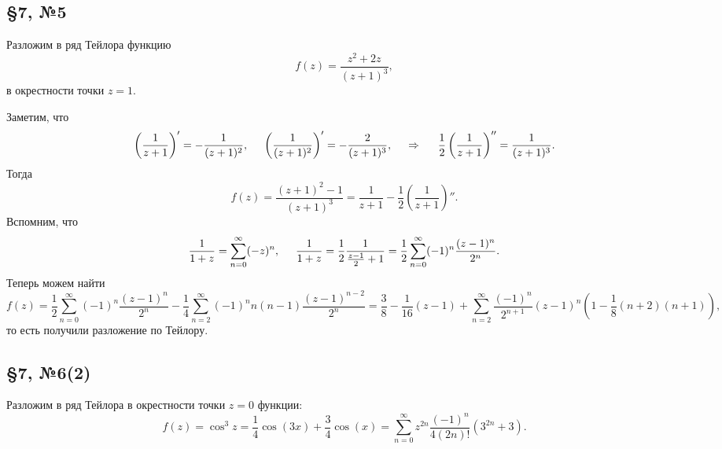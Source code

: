 \subsection*{\S7, №5}

Разложим в ряд Тейлора функцию
\begin{equation*}
    f(z) = \frac{z^2 + 2 z}{(z+1)^3},
\end{equation*}
в окрестности точки $z = 1$. 

Заметим, что
\begin{equation*}
    \left(\frac{1}{z+1}\right)' = - \frac{1}{(z+1)^2},
    \hspace{5 mm} 
    \left(\frac{1}{(z+1)^2}\right)' = - \frac{2}{(z+1)^3},
    \hspace{0.5cm} \Rightarrow \hspace{0.5cm}
    \frac{1}{2} \left(\frac{1}{z+1}\right)'' = \frac{1}{(z+1)^3}.
\end{equation*}
Тогда
\begin{equation*}
    f(z) = \frac{(z+1)^2 - 1}{(z+1)^3} = \frac{1}{z + 1} - \frac{1}{2} \left(\frac{1}{z + 1}\right)''.
\end{equation*}
Вспомним, что
\begin{equation*}
    \frac{1}{1 + z} = \sum_{n=0}^{\infty} (-z)^n,
    \hspace{5 mm} 
    \frac{1}{1+z} = \frac{1}{2} \frac{1}{\frac{z-1}{2}+1} = \frac{1}{2} \sum_{n=0}^{\infty} (-1)^n \frac{(z-1)^n}{2^n}.
\end{equation*}
Теперь можем найти
\begin{equation*}
    f(z) = \frac{1}{2} \sum_{n=0}^{\infty}  (-1)^n \frac{(z-1)^n}{2^n} - 
    \frac{1}{4} \sum_{n=2}^{\infty}  (-1)^n n (n-1) \frac{(z-1)^{n-2}}{2^n} = 
    \frac{3}{8} - \frac{1}{16}(z-1) + 
    \sum_{n=2}^{\infty} \frac{(-1)^n}{2^{n+1}} (z-1)^n \left(
        1 - \frac{1}{8}(n+2) (n+1)
    \right),
\end{equation*}
то есть получили разложение по Тейлору. 




\subsection*{\S7, №6(2)}

Разложим в ряд Тейлора в окрестности точки $z= 0$ функции:
\begin{equation*}
    f(z) = \cos^3 z = \frac{1}{4} \cos(3x) + \frac{3}{4} \cos(x) = 
    \sum_{n=0}^{\infty} z^{2n} \frac{(-1)^n}{4 (2n)!} \left(3^{2n} + 3\right).
\end{equation*}


